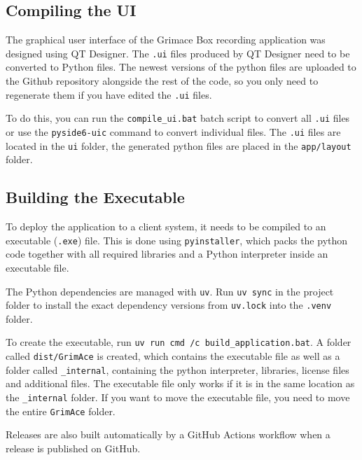 \subsection{Compiling the UI}
The graphical user interface of the Grimace Box recording application was designed using QT Designer.
The \verb!.ui! files produced by QT Designer need to be converted to Python files.
The newest versions of the python files are uploaded to the Github repository alongside the rest of the code,
so you only need to regenerate them if you have edited the \verb!.ui! files.

To do this, you can run the \verb!compile_ui.bat! batch script to convert all \verb!.ui! files
or use the \verb!pyside6-uic! command to convert individual files.
The \verb!.ui! files are located in the \verb!ui! folder,
the generated python files are placed in the \verb!app/layout! folder.

\subsection{Building the Executable}
To deploy the application to a client system, it needs to be compiled to an executable (\verb!.exe!) file.
This is done using \verb!pyinstaller!, which packs the python code together with all
required libraries and a Python interpreter inside an executable file.

The Python dependencies are managed with \verb!uv!.
Run \verb!uv sync! in the project folder to install the exact dependency versions from \verb!uv.lock!
into the \verb!.venv! folder.

To create the executable, run \verb!uv run cmd /c build_application.bat!.
A folder called \verb!dist/GrimAce! is created, which contains the executable file as well as a
folder called \verb!_internal!, containing the python interpreter, libraries, license files and additional files.
The executable file only works if it is in the same location as the \verb!_internal! folder.
If you want to move the executable file, you need to move the entire \verb!GrimAce! folder.

Releases are also built automatically by a GitHub Actions workflow when a release is published on GitHub.
